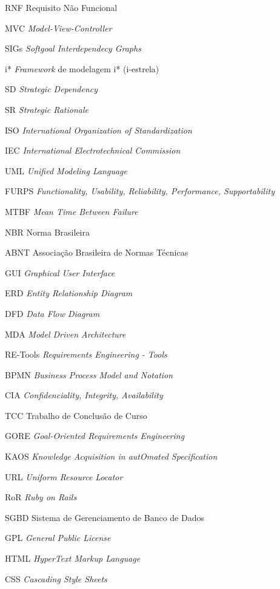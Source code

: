 \begin{siglas}
  \item[RNF] Requisito Não Funcional
  \item[MVC] \textit{Model-View-Controller}
  \item[SIGs] \textit{Softgoal Interdependecy Graphs}
  \item[i*] \textit{Framework} de modelagem i* (i-estrela)
  \item[SD] \textit{Strategic Dependency}
  \item[SR] \textit{Strategic Rationale}
  \item[ISO] \textit{International Organization of Standardization}
  \item[IEC] \textit{International Electrotechnical Commission}
  \item[UML] \textit{Unified Modeling Language}
  \item[FURPS] \textit{Functionality, Usability, Reliability, Performance, Supportability}
  \item[MTBF] \textit{Mean Time Between Failure}
  \item[NBR] Norma Brasileira
  \item[ABNT] Associação Brasileira de Normas Técnicas
  \item[GUI] \textit{Graphical User Interface}
  \item[ERD] \textit{Entity Relationship Diagram}
  \item[DFD] \textit{Data Flow Diagram}
  \item[MDA] \textit{Model Driven Architecture}
  \item[RE-Tools] \textit{Requirements Engineering - Tools}
  \item[BPMN] \textit{Business Process Model and Notation}
  \item[CIA] \textit{Confidenciality, Integrity, Availability}
  \item[TCC] Trabalho de Conclusão de Curso
  \item[GORE] \textit{Goal-Oriented Requirements Engineering}
  \item[KAOS] \textit{Knowledge Acquisition in autOmated Specification}
  \item[URL] \textit{Uniform Resource Locator}
  \item[RoR] \textit{Ruby on Rails}
  \item[SGBD] Sistema de Gerenciamento de Banco de Dados
  \item[GPL] \textit{General Public License}
  \item[HTML] \textit{HyperText Markup Language}
  \item[CSS] \textit{Cascading Style Sheets}
\end{siglas}
